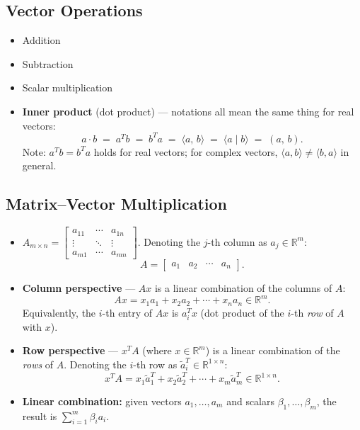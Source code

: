 \documentclass[hidelinks]{article}
\begin{document}
\subsection{Vector Operations}
\begin{itemize}
    \item Addition
    \item Subtraction
    \item Scalar multiplication
    \item \textbf{Inner product} (dot product) — notations all mean the same thing for real vectors:
    \[
        a \cdot b \;=\; a^T b \;=\; b^T a \;=\; \langle a,\, b \rangle \;=\; \langle a \mid b \rangle \;=\; (a,\, b).
    \]
    Note: $a^T b = b^T a$ holds for real vectors; for complex vectors, $\langle a, b\rangle \neq \langle b, a\rangle$ in general.
\end{itemize}

\subsection{Matrix--Vector Multiplication}
\begin{itemize}
    \item $A_{m \times n} = \begin{bmatrix} a_{11} & \cdots & a_{1n} \\ \vdots & \ddots & \vdots \\ a_{m1} & \cdots & a_{mn} \end{bmatrix}$.
    Denoting the $j$-th column as $a_j \in \mathbb{R}^m$:
    \[A = \begin{bmatrix} a_1 & a_2 & \cdots & a_n \end{bmatrix}.\]

    \item \textbf{Column perspective} — $Ax$ is a linear combination of the columns of $A$:
    \[
        Ax = x_1 a_1 + x_2 a_2 + \cdots + x_n a_n \in \mathbb{R}^m.
    \]
    Equivalently, the $i$-th entry of $Ax$ is $a_i^T x$ (dot product of the $i$-th \emph{row} of $A$ with $x$).

    \item \textbf{Row perspective} — $x^T A$ (where $x\in\mathbb{R}^m$) is a linear combination of the \emph{rows} of $A$. Denoting the $i$-th row as $\tilde{a}_i^T \in \mathbb{R}^{1\times n}$:
    \[
        x^T A = x_1 \tilde{a}_1^T + x_2 \tilde{a}_2^T + \cdots + x_m \tilde{a}_m^T \in \mathbb{R}^{1\times n}.
    \]

    \item \textbf{Linear combination:} given vectors $a_1, \ldots, a_m$ and scalars $\beta_1, \ldots, \beta_m$, the result is $\displaystyle\sum_{i=1}^{m} \beta_i a_i$.
\end{itemize}
\end{document}
